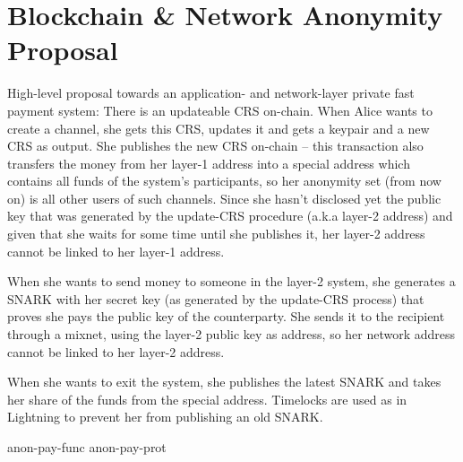 \section{Blockchain \& Network Anonymity Proposal}
  \label{sec:app-net-anon}
  High-level proposal towards an application- and network-layer private fast
  payment system: There is an updateable CRS on-chain. When Alice wants to
  create a channel, she gets this CRS, updates it and gets a keypair and a new
  CRS as output. She publishes the new CRS on-chain -- this transaction also
  transfers the money from her layer-1 address into a special address which
  contains all funds of the system's participants, so her anonymity set (from
  now on) is all other users of such channels. Since she hasn't disclosed yet
  the public key that was generated by the update-CRS procedure (a.k.a layer-2
  address) and given that she waits for some time until she publishes it, her
  layer-2 address cannot be linked to her layer-1 address.

  When she wants to send money to someone in the layer-2 system, she generates a
  SNARK with her secret key (as generated by the update-CRS process) that proves
  she pays the public key of the counterparty. She sends it to the recipient
  through a mixnet, using the layer-2 public key as address, so her network
  address cannot be linked to her layer-2 address.

  When she wants to exit the system, she publishes the latest SNARK and takes
  her share of the funds from the special address. Timelocks are used as in
  Lightning to prevent her from publishing an old SNARK.

  {anon-pay-func}
  {anon-pay-prot}
